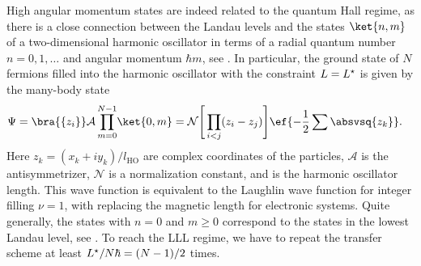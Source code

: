High angular momentum states are indeed related to the quantum Hall regime, as there is a close connection between the Landau levels and the states $\ket{n,m}$ of a two-dimensional harmonic oscillator in terms of a radial quantum number $n=0,1,\dots$ and angular momentum $\hbar m$, see . In particular, the ground state of $N$ fermions filled into the harmonic oscillator with the constraint $L=L^{\star}$ is given by the many-body state
\begin{align*}
\Psi&= \bra{\{z_i\}}\mathcal{A} \prod_{m=0}^{N-1} \!\ket{0,m} = \mathcal{N}\Bigg[\prod_{i<j} (z_i-z_j) \Bigg] \ef{-\frac{1}{2}\sum\absvsq{z_k}}.
\end{align*}
Here $z_k=(x_k+i y_k)/l_\text{HO}$ are complex coordinates of the particles, $\mathcal{A}$ is the antisymmetrizer, $\mathcal{N}$ is a normalization constant, and  is the harmonic oscillator length. This wave function is equivalent to the Laughlin wave function for integer filling $\nu=1$, with    replacing the magnetic length  for electronic systems. Quite generally, the states with $n=0$ and $m\ge 0$ correspond to the states in the lowest Landau level, see .
To reach the LLL regime, we have to repeat the transfer scheme at least $L^{\star}/N\hbar=(N-1)/2$ times.



